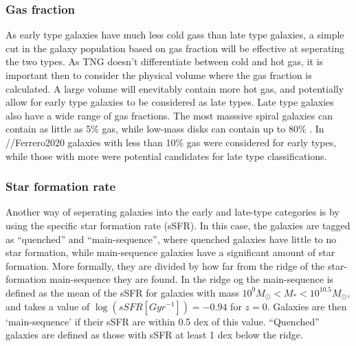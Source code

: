 \subsubsection{Gas fraction}
As early type galaxies have much less cold gass than late type galaxies, a simple cut in the galaxy population based on gas fraction will be effective at seperating the two types. As TNG doesn't differentiate between cold and hot gas, it is important then to consider the physical volume where the gas fraction is calculated. A large volume will enevitably contain more hot gas, and potentially allow for early type galaxies to be considered as late types. Late type galaxies also have a wide range of gas fractions. The most masssive spiral galaxies can contain as little as 5\% gas, while low-mass disks can contain up to 80\% \parencite{Mo2010}. In //Ferrero2020 galaxies with less than 10\% gas were considered for early types, while those with more were potential candidates for late type classifications. 

\subsubsection{Star formation rate}
Another way of seperating galaxies into the early and late-type categories is by using the specific star formation rate (sSFR). In this case, the galaxies are tagged as ``quenched'' and ``main-sequence'', where quenched galaxies have little to no star formation, while main-sequence galaxies have a significant amount of star formation. More formally, they are divided by how far from the ridge of the star-formation main-sequence they are found. In \cite{Genel2017} the ridge og the main-sequence is defined as the mean of the sSFR for galaxies with mass $10^{9} M_{\odot} < M_* < 10^{10.5} M_{\odot}$, and takes a value of $\log (sSFR[Gyr^{-1}]) = -0.94$ for $z=0$. Galaxies are then `main-sequence' if their sSFR are within 0.5 dex of this value. ``Quenched'' galaxies are defined as those with sSFR at least 1 dex below the ridge.

